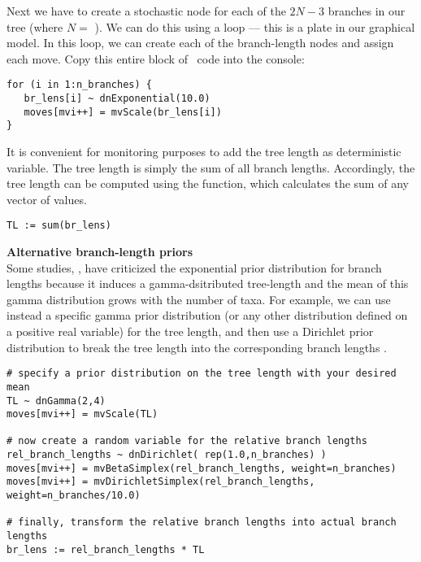 Next we have to create a stochastic node for each of the $2N-3$ branches in our tree (where $N=$ ). 
We can do this using a  loop --- this is a plate in our graphical model. In this loop, we can create each of the branch-length nodes and assign each move. 
Copy this entire block of \Rev~code into the console:
{\tt \small \begin{snugshade*}
\begin{lstlisting}
for (i in 1:n_branches) {
   br_lens[i] ~ dnExponential(10.0)
   moves[mvi++] = mvScale(br_lens[i]) 
}
\end{lstlisting}
\end{snugshade*}}

It is convenient for monitoring purposes to add the tree length as deterministic variable. 
The tree length is simply the sum of all branch lengths. 
Accordingly, the tree length can be computed using the  function, which calculates the sum of any vector of values.
{\tt \begin{snugshade*}
\begin{lstlisting}
TL := sum(br_lens)
\end{lstlisting}
\end{snugshade*}}

\begin{framed}
\textbf{Alternative branch-length priors}\\
Some studies, \EG \cite{Brown2010,Rannala2012}, have criticized the exponential prior distribution for branch lengths because it induces a gamma-dsitributed tree-length and the mean of this gamma distribution grows with the number of taxa.
For example, we can use instead a specific gamma prior distribution (or any other distribution defined on a positive real variable) for the tree length, and then use a Dirichlet prior distribution to break the tree length into the corresponding branch lengths \citep{Zhang2012}.
{\tt \begin{snugshade*}
\begin{lstlisting}
# specify a prior distribution on the tree length with your desired mean
TL ~ dnGamma(2,4)
moves[mvi++] = mvScale(TL) 

# now create a random variable for the relative branch lengths
rel_branch_lengths ~ dnDirichlet( rep(1.0,n_branches) )
moves[mvi++] = mvBetaSimplex(rel_branch_lengths, weight=n_branches)
moves[mvi++] = mvDirichletSimplex(rel_branch_lengths, weight=n_branches/10.0)

# finally, transform the relative branch lengths into actual branch lengths
br_lens := rel_branch_lengths * TL
\end{lstlisting}
\end{snugshade*}}
\end{framed}


